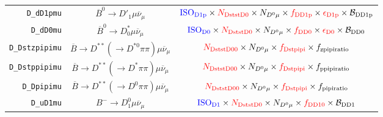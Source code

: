 \begin{landscape}
\begin{table}
\begin{tabular}{r|c|c}
       \texttt{D\_dD1pmu} &               $\overline{B}^0 \rightarrow D'_1 \mu \overline{\nu}_\mu$               &                                                                        $\textcolor{blue}{\text{ISO}_\text{D1p}} \times \textcolor{red}{N_\text{DststD0}} \times N_{D^0 \mu} \times \textcolor{red}{f_\text{DD1p}} \times \textcolor{red}{\epsilon_\text{D1p}} \times \mathcal{B}_\text{DD1p}$                                                                         \\
        \texttt{D\_dD0mu} &              $\overline{B}^0 \rightarrow D^*_0 \mu \overline{\nu}_\mu$               &                                                                          $\textcolor{blue}{\text{ISO}_\text{D0}} \times \textcolor{red}{N_\text{DststD0}} \times N_{D^0 \mu} \times \textcolor{red}{f_\text{DD0}} \times \textcolor{red}{\epsilon_\text{D0}} \times \mathcal{B}_\text{DD0}$                                                                           \\
   \texttt{D\_Dstzpipimu} & $\overline{B} \rightarrow D^{**} (\rightarrow D^{*0} \pi\pi) \mu \overline{\nu}_\mu$ &                                                                                                                      $\textcolor{red}{N_\text{DststD00}} \times N_{D^0 \mu} \times \textcolor{red}{f_\text{Dstpipi}} \times f_\text{zpipiratio}$                                                                                                                      \\
   \texttt{D\_Dstppipimu} &  $\overline{B} \rightarrow D^{**} (\rightarrow D^* \pi\pi) \mu \overline{\nu}_\mu$   &                                                                                                                      $\textcolor{red}{N_\text{DststD00}} \times N_{D^0 \mu} \times \textcolor{red}{f_\text{Dstpipi}} \times f_\text{ppipiratio}$                                                                                                                      \\
      \texttt{D\_Dpipimu} &  $\overline{B} \rightarrow D^{**} (\rightarrow D^0 \pi\pi) \mu \overline{\nu}_\mu$   &                                                                                                                      $\textcolor{red}{N_\text{DststD00}} \times N_{D^0 \mu} \times \textcolor{red}{f_\text{Dstpipi}} \times f_\text{pipiratio}$                                                                                                                       \\
        \texttt{D\_uD1mu} &                    $B^- \rightarrow D_1^0 \mu \overline{\nu}_\mu$                    &                                                                                               $\textcolor{blue}{\text{ISO}_\text{D1}} \times \textcolor{red}{N_\text{DststD0}} \times N_{D^0 \mu} \times \textcolor{red}{f_\text{DD10}} \times \mathcal{B}_\text{DD1}$                                                                                                \\

\end{tabular}
\end{table}
\end{landscape}
